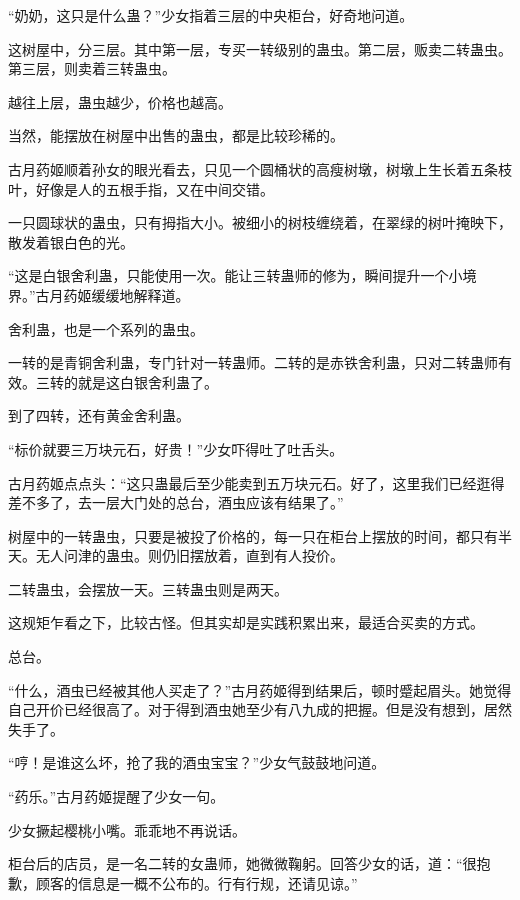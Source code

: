 
\begin{this_body}

“奶奶，这只是什么蛊？”少女指着三层的中央柜台，好奇地问道。

这树屋中，分三层。其中第一层，专买一转级别的蛊虫。第二层，贩卖二转蛊虫。第三层，则卖着三转蛊虫。

越往上层，蛊虫越少，价格也越高。

当然，能摆放在树屋中出售的蛊虫，都是比较珍稀的。

古月药姬顺着孙女的眼光看去，只见一个圆桶状的高瘦树墩，树墩上生长着五条枝叶，好像是人的五根手指，又在中间交错。

一只圆球状的蛊虫，只有拇指大小。被细小的树枝缠绕着，在翠绿的树叶掩映下，散发着银白色的光。

“这是白银舍利蛊，只能使用一次。能让三转蛊师的修为，瞬间提升一个小境界。”古月药姬缓缓地解释道。

舍利蛊，也是一个系列的蛊虫。

一转的是青铜舍利蛊，专门针对一转蛊师。二转的是赤铁舍利蛊，只对二转蛊师有效。三转的就是这白银舍利蛊了。

到了四转，还有黄金舍利蛊。

“标价就要三万块元石，好贵！”少女吓得吐了吐舌头。

古月药姬点点头：“这只蛊最后至少能卖到五万块元石。好了，这里我们已经逛得差不多了，去一层大门处的总台，酒虫应该有结果了。”

树屋中的一转蛊虫，只要是被投了价格的，每一只在柜台上摆放的时间，都只有半天。无人问津的蛊虫。则仍旧摆放着，直到有人投价。

二转蛊虫，会摆放一天。三转蛊虫则是两天。

这规矩乍看之下，比较古怪。但其实却是实践积累出来，最适合买卖的方式。

总台。

“什么，酒虫已经被其他人买走了？”古月药姬得到结果后，顿时蹙起眉头。她觉得自己开价已经很高了。对于得到酒虫她至少有八九成的把握。但是没有想到，居然失手了。

“哼！是谁这么坏，抢了我的酒虫宝宝？”少女气鼓鼓地问道。

“药乐。”古月药姬提醒了少女一句。

少女撅起樱桃小嘴。乖乖地不再说话。

柜台后的店员，是一名二转的女蛊师，她微微鞠躬。回答少女的话，道：“很抱歉，顾客的信息是一概不公布的。行有行规，还请见谅。”


\end{this_body}
